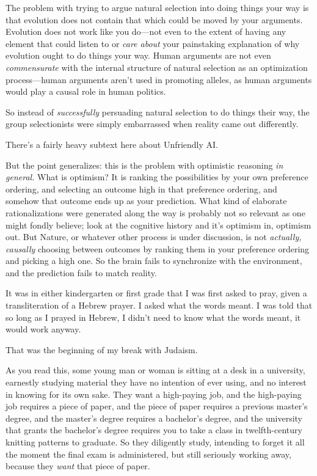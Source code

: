{{{
 The problem with trying to argue natural selection into doing
things your way is that evolution does not contain that which could be
moved by your arguments. Evolution does not work like you do---not even
to the extent of having any element that could listen to or
\textit{care about} your painstaking explanation of why evolution ought
to do things your way. Human arguments are not even
\textit{commensurate} with the internal structure of natural selection
as an optimization process---human arguments aren't
used in promoting alleles, as human arguments would play a causal role
in human politics.}

{
 So instead of \textit{successfully} persuading natural selection
to do things their way, the group selectionists were simply embarrassed
when reality came out differently.}

{
 There's a fairly heavy subtext here about
Unfriendly AI.}

{
 But the point generalizes: this is the problem with optimistic
reasoning \textit{in general.} What is optimism? It is ranking the
possibilities by your own preference ordering, and selecting an outcome
high in that preference ordering, and somehow that outcome ends up as
your prediction. What kind of elaborate rationalizations were generated
along the way is probably not so relevant as one might fondly believe;
look at the cognitive history and it's optimism in,
optimism out. But Nature, or whatever other process is under
discussion, is not \textit{actually, causally} choosing between
outcomes by ranking them in your preference ordering and picking a high
one. So the brain fails to synchronize with the environment, and the
prediction fails to match reality.}

\myendsectiontext


\bigskip


{
 It was in either kindergarten or first grade that I was first
asked to pray, given a transliteration of a Hebrew prayer. I asked what
the words meant. I was told that so long as I prayed in Hebrew, I
didn't need to know what the words meant, it would work
anyway. }

{
 That was the beginning of my break with Judaism.}

{
 As you read this, some young man or woman is sitting at a desk in
a university, earnestly studying material they have no intention of
ever using, and no interest in knowing for its own sake. They want a
high-paying job, and the high-paying job requires a piece of paper, and
the piece of paper requires a previous master's degree,
and the master's degree requires a
bachelor's degree, and the university that grants the
bachelor's degree requires you to take a class in
twelfth-century knitting patterns to graduate. So they diligently
study, intending to forget it all the moment the final exam is
administered, but still seriously working away, because they
\textit{want} that piece of paper.}

}}
